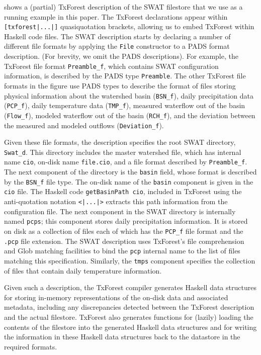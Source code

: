 shows a (partial) TxForest description of the SWAT filestore that we use
as a running example in this paper.
The TxForest declarations appear within \texttt{[txforest|...|]}
quasiquotation brackets, allowing us to embed TxForest within Haskell
code files.  The SWAT description starts by declaring a number of
different file formats by applying the \texttt{File} constructor to
a PADS format description.  (For brevity, we omit the PADS
descriptions).   For example, the TxForest file format
\texttt{Preamble\_f}, which contains SWAT configuration information,
is described by the PADS type \texttt{Preamble}.
The other TxForest file formats in the figure use PADS types to
describe the format of files storing 
physical information about the watershed basin (\texttt{BSN\_f}),
daily precipitation data (\texttt{PCP\_f}),
daily temperature data (\texttt{TMP\_f}),
measured waterflow out of the basin (\texttt{Flow\_f}),
modeled waterflow out of the basin (\texttt{RCH\_f}),
and the deviation between the measured and modeled outflows (\texttt{Deviation\_f}).

Given these file formats, the description specifies the root SWAT
directory, \texttt{Swat\_d}.  This directory includes the master
watershed file, which has internal name \texttt{cio}, on-disk name
\texttt{file.cio}, and a file format described by
\texttt{Preamble\_f}.  The next component of the directory is the
\texttt{basin} field, whose format is described by the \texttt{BSN\_f}
file type.  The on-disk name of the \texttt{basin} component is given
in the \texttt{cio} file.  The Haskell code \texttt{getBasinPath cio},
included in TxForest using the anti-quotation notation
\texttt{<|...|>} extracts this path information from the configuration
file.  The next component in the SWAT directory is internally named
\texttt{pcps}; this component stores daily precipitation information.
It is stored on disk as a collection of files each of which has the
\texttt{PCP\_f} file format and the \texttt{.pcp} file extension.  The
SWAT description uses TxForest's file comprehension and Glob matching
facilities to bind the \texttt{pcp} internal name to the list of files
matching this specification.  Similarly, the \texttt{tmps} component
specifies the collection of files that contain daily temperature
information.

Given such a description, the TxForest compiler generates Haskell data
structures for storing in-memory representations of the on-disk data
and associated metadata, including any discrepancies detected between
the TxForest description and the actual filestore.  TxForest also
generates functions for (lazily) loading the contents of the filestore
into the generated Haskell data structures and for writing the
information in these Haskell data structures back to the datastore in
the required formats.

